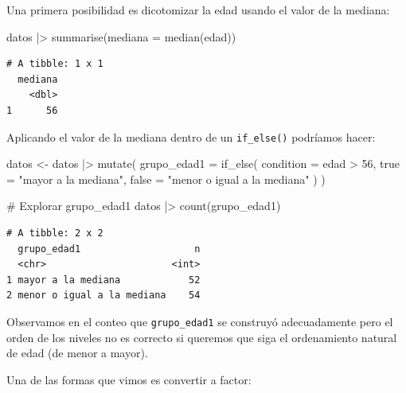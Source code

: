 \documentclass[
  spanish,
  a4paper,
]{scrbook}
\newenvironment{Shaded}{\begin{snugshade}}{\end{snugshade}}
\newcommand{\AttributeTok}[1]{\textcolor[rgb]{0.40,0.45,0.13}{#1}}
\newcommand{\CommentTok}[1]{\textcolor[rgb]{0.37,0.37,0.37}{#1}}
\newcommand{\DecValTok}[1]{\textcolor[rgb]{0.68,0.00,0.00}{#1}}
\newcommand{\FunctionTok}[1]{\textcolor[rgb]{0.28,0.35,0.67}{#1}}
\newcommand{\NormalTok}[1]{\textcolor[rgb]{0.00,0.23,0.31}{#1}}
\newcommand{\OtherTok}[1]{\textcolor[rgb]{0.00,0.23,0.31}{#1}}
\newcommand{\SpecialCharTok}[1]{\textcolor[rgb]{0.37,0.37,0.37}{#1}}
\newcommand{\StringTok}[1]{\textcolor[rgb]{0.13,0.47,0.30}{#1}}
\begin{document}
Una primera posibilidad es dicotomizar la edad usando el valor de la
mediana:

\begin{Shaded}
\begin{Highlighting}[]
\NormalTok{datos }\SpecialCharTok{|\textgreater{}}
  \FunctionTok{summarise}\NormalTok{(}\AttributeTok{mediana =} \FunctionTok{median}\NormalTok{(edad))}
\end{Highlighting}
\end{Shaded}

\begin{verbatim}
# A tibble: 1 x 1
  mediana
    <dbl>
1      56
\end{verbatim}

Aplicando el valor de la mediana dentro de un \texttt{if\_else()}
podríamos hacer:

\begin{Shaded}
\begin{Highlighting}[]
\NormalTok{datos }\OtherTok{\textless{}{-}}\NormalTok{ datos }\SpecialCharTok{|\textgreater{}}
  \FunctionTok{mutate}\NormalTok{(}
    \AttributeTok{grupo\_edad1 =} \FunctionTok{if\_else}\NormalTok{(}
      \AttributeTok{condition =}\NormalTok{ edad }\SpecialCharTok{\textgreater{}} \DecValTok{56}\NormalTok{,}
      \AttributeTok{true =} \StringTok{"mayor a la mediana"}\NormalTok{,}
      \AttributeTok{false =} \StringTok{"menor o igual a la mediana"}
\NormalTok{    )}
\NormalTok{  )}

\CommentTok{\# Explorar grupo\_edad1}
\NormalTok{datos }\SpecialCharTok{|\textgreater{}}
  \FunctionTok{count}\NormalTok{(grupo\_edad1)}
\end{Highlighting}
\end{Shaded}

\begin{verbatim}
# A tibble: 2 x 2
  grupo_edad1                    n
  <chr>                      <int>
1 mayor a la mediana            52
2 menor o igual a la mediana    54
\end{verbatim}

Observamos en el conteo que \texttt{grupo\_edad1} se construyó
adecuadamente pero el orden de los niveles no es correcto si queremos
que siga el ordenamiento natural de edad (de menor a mayor).

Una de las formas que vimos es convertir a factor:
\end{document}
